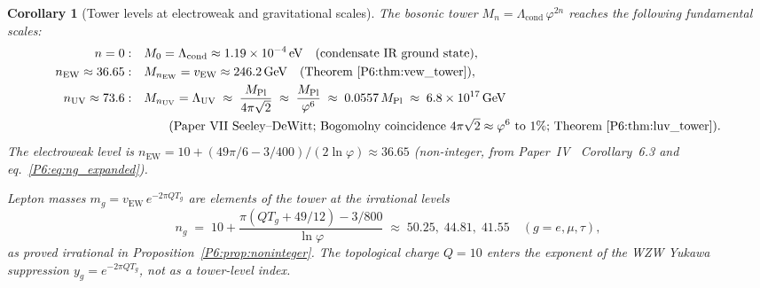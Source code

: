 \documentclass[11pt,a4paper]{article}
\newtheorem{corollary}[theorem]{Corollary}
\theoremstyle{definition}
\theoremstyle{remark}
\newcommand{\vp}{\varphi}
\newcommand{\vEW}{v_{\mathrm{EW}}}
\newcommand{\Lcond}{\Lambda_{\mathrm{cond}}}
\newcommand{\LUV}{\Lambda_{\mathrm{UV}}}
\newcommand{\MPl}{M_{\mathrm{Pl}}}
\begin{document}
\begin{corollary}[Tower levels at electroweak and gravitational scales]
\label{P6:cor:tower_scales}
The bosonic tower $M_n = \Lcond\,\vp^{2n}$ reaches the following
fundamental scales:
\begin{align}
  n = 0: & \quad M_0 = \Lcond \approx 1.19\times10^{-4}\,\mathrm{eV}
             \quad(\text{condensate IR ground state}), \\
  n_{\mathrm{EW}} \approx 36.65: & \quad M_{n_{\mathrm{EW}}} = \vEW \approx 246.2\,\mathrm{GeV}
             \quad(\text{Theorem~\ref{P6:thm:vew_tower}}), \\
  n_{\mathrm{UV}} \approx 73.6: & \quad M_{n_{\mathrm{UV}}} = \LUV
             \;\approx\; \frac{\MPl}{4\pi\sqrt{2}}
             \;\approx\; \frac{\MPl}{\vp^6}
             \;\approx\; 0.0557\,\MPl
             \;\approx\; 6.8\times10^{17}\,\mathrm{GeV}
             \notag\\
             & \quad\qquad(\text{Paper~VII Seeley--DeWitt; Bogomolny
             coincidence $4\pi\sqrt{2}\approx\vp^6$ to $1\%$;
             Theorem~\ref{P6:thm:luv_tower}}).
\end{align}
The electroweak level is
$n_{\mathrm{EW}} = 10 + (49\pi/6-3/400)/(2\ln\vp) \approx 36.65$
(non-integer, from Paper~IV~\cite{Paper4} Corollary~6.3 and eq.~\eqref{P6:eq:ng_expanded}).

Lepton masses $m_g = \vEW\,e^{-2\pi Q T_g}$ are elements of the tower at
the \emph{irrational} levels
\[
  n_g \;=\; 10 + \frac{\pi(QT_g+49/12)-3/800}{\ln\vp}
  \;\approx\; 50.25,\; 44.81,\; 41.55
  \quad (g=e,\mu,\tau),
\]
as proved irrational in Proposition~\ref{P6:prop:noninteger}.
The topological charge $Q=10$ enters the \emph{exponent} of the WZW Yukawa
suppression $y_g = e^{-2\pi Q T_g}$, not as a tower-level index.
\end{corollary}
\end{document}
